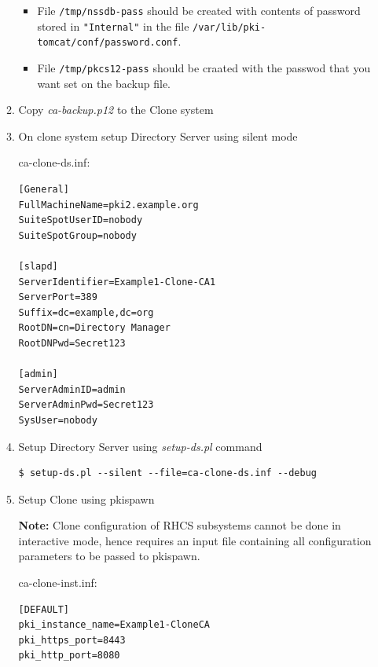 \documentclass[a4paper]{article}
\begin{document}
\begin{enumerate}[label*=\arabic*.]
\begin{enumerate}[label*=\arabic*.]
                        \begin{itemize}
                            \item File \texttt{/tmp/nssdb-pass} should be created with contents of password stored in
                        \texttt{"Internal"} in the file \texttt{/var/lib/pki-tomcat/conf/password.conf}. 
                            \item File \texttt{/tmp/pkcs12-pass} should be craated with the passwod that you want set on
                                the backup file. 
                        \end{itemize}
                    \item Copy \textit{ca-backup.p12} to the Clone system
                    \item On clone system setup Directory Server using silent mode

ca-clone-ds.inf:                         
                        \begin{lstlisting}[style=configFile]
[General]
FullMachineName=pki2.example.org
SuiteSpotUserID=nobody
SuiteSpotGroup=nobody

[slapd]
ServerIdentifier=Example1-Clone-CA1
ServerPort=389
Suffix=dc=example,dc=org
RootDN=cn=Directory Manager
RootDNPwd=Secret123

[admin]
ServerAdminID=admin
ServerAdminPwd=Secret123
SysUser=nobody                       
                        \end{lstlisting}
                    \item Setup Directory Server using \textit{setup-ds.pl} command
                        \begin{lstlisting}[style=bashInputStyle]
$ setup-ds.pl --silent --file=ca-clone-ds.inf --debug                    
                        \end{lstlisting}

                    \item Setup Clone using pkispawn
                    
                    \textbf{Note:} Clone configuration of RHCS subsystems cannot be done in interactive mode, hence requires
                    an input file containing all configuration parameters to be passed to pkispawn.

ca-clone-inst.inf:                    
                    \begin{lstlisting}[style=configFile]
[DEFAULT]
pki_instance_name=Example1-CloneCA
pki_https_port=8443
pki_http_port=8080


\end{lstlisting}
\end{enumerate}
\end{enumerate}
\end{document}
